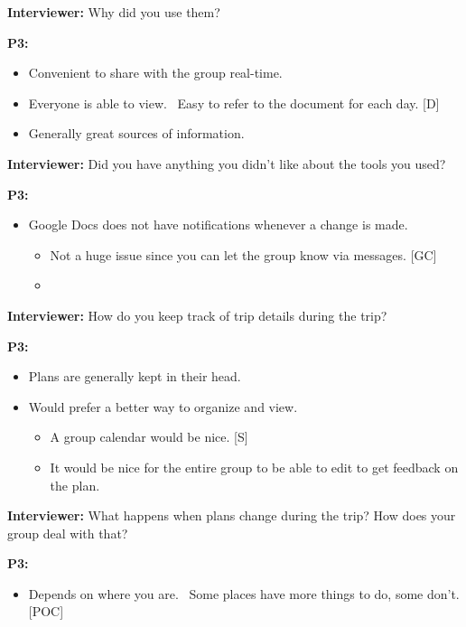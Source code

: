 \documentclass[12pt,a4paper]{article}
\begin{document}
\textbf{Interviewer: }Why did you use them? 

\textbf{P3:}

\begin{itemize}
    \item Convenient to share with the group real-time. 
    \item Everyone is able to view. 
Easy to refer to the document for each day. [D]

    \item Generally great sources of information.
\end{itemize}

\textbf{Interviewer:} Did you have anything you didn’t like about the tools you used?  

\textbf{P3:}

\begin{itemize}
    \item Google Docs does not have notifications whenever a change is made. 
    \begin{itemize}
        \item Not a huge issue since you can let the group know via messages. [GC]
        \item 

    \end{itemize}
\end{itemize}
\textbf{Interviewer:} How do you keep track of trip details during the trip?  

\textbf{P3:}

\begin{itemize}
    \item Plans are generally kept in their head. 
    \item Would prefer a better way to organize and view. 
    \begin{itemize}
        \item A group calendar would be nice. [S]
        \item It would be nice for the entire group to be able to edit to get feedback on the plan.
    \end{itemize}
\end{itemize}

\textbf{Interviewer:} What happens when plans change during the trip? How does your group deal with that?   

\textbf{P3:}

\begin{itemize}
    \item Depends on where you are. 
Some places have more things to do, some don’t. [POC]

\end{itemize}
\end{document}
